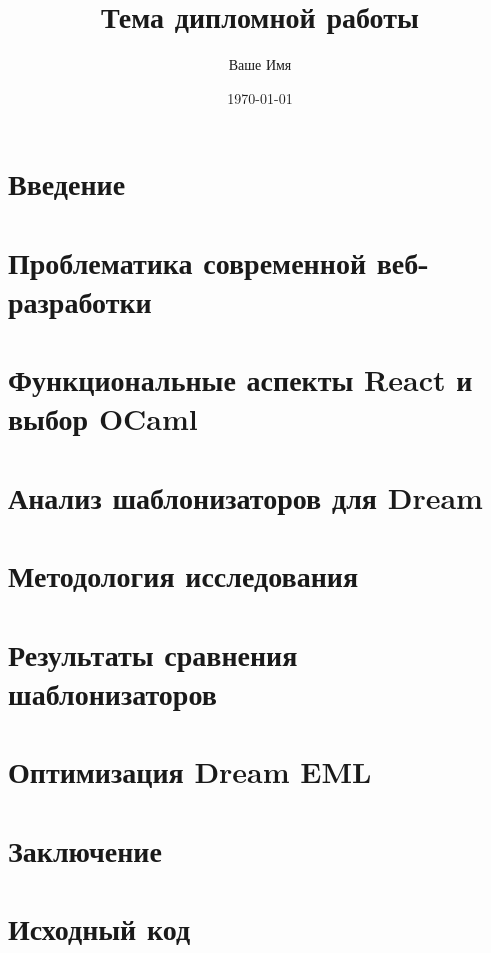 \documentclass[a4paper,12pt]{report}
\title{Тема дипломной работы}
\author{Ваше Имя}
\date{\today}
\begin{document}
\maketitle
\tableofcontents

\chapter*{Введение}


\chapter{Проблематика современной веб-разработки}


\chapter{Функциональные аспекты React и выбор OCaml}


\chapter{Анализ шаблонизаторов для Dream}


\chapter{Методология исследования}


\chapter{Результаты сравнения шаблонизаторов}


\chapter{Оптимизация Dream EML}


\chapter*{Заключение}






\appendix
\chapter{Исходный код}
\end{document}
